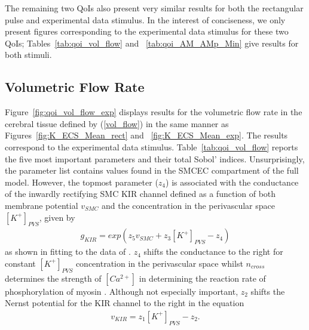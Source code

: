 The remaining two QoIs also present very similar results for both the rectangular pulse and experimental data stimulus. In the interest of conciseness, we only present figures corresponding to the experimental data stimulus for these two QoIs; Tables~\ref{tab:qoi_vol_flow} and ~\ref{tab:qoi_AM_AMp_Min} give results for both stimuli. 

\subsection{Volumetric Flow Rate}

Figure~\ref{fig:qoi_vol_flow_exp} displays results for the volumetric flow rate in the cerebral tissue defined by (\ref{vol_flow})  in the same manner as Figures~\ref{fig:K_ECS_Mean_rect} and ~\ref{fig:K_ECS_Mean_exp}. The results correspond to the experimental data stimulus.  Table~\ref{tab:qoi_vol_flow} reports the five most important parameters and their total Sobol' indices. Unsurprisingly, the parameter list contains values found in the SMCEC compartment of the full model. However, the topmost parameter ($z_4$) is associated with the conductance of the inwardly rectifying SMC KIR channel defined as a function of both membrane potential $v_{SMC}$ and the \pot concentration in the perivascular space $[K^+]_{PVS}$, given by 
\begin{eqnarray}
g_{KIR}=exp\left( z_5 v_{SMC}+z_3[K^+]_{PVS}-z_4\right)  \label{eq:gkir}
\end{eqnarray}
as shown in \cite{Dormanns2015} fitting to the data of \cite{Filosa2006}. $z_4$ shifts the conductance to the right for constant $[K^+]_{PVS}$  concentration in the perivascular space whilst $n_{cross}$ determines the strength of $[Ca^{2+}]$ in determining the reaction rate of phosphorylation of myosin \cite{Hai1988}. Although not especially important, $z_2$ shifts the Nernst potential for the KIR channel to the right in the equation
\begin{eqnarray}
v_{KIR}=z_1 [K^+]_{PVS}-z_2. \label{vkir}
\end{eqnarray}

